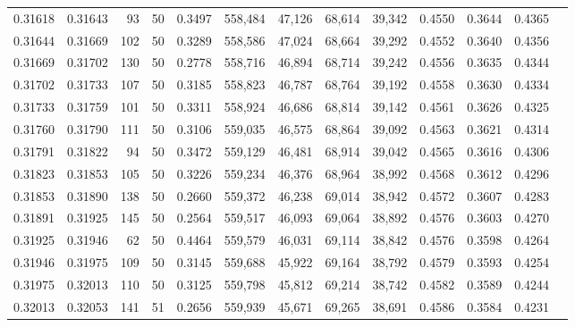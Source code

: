 \begin{tabular}{rrrrrrrrrrrrr}
0.31618 & 0.31643 &    93 &  50 &                                     0.3497 & 558,484 &  47,126 &  68,614 &  39,342 & 0.4550 & 0.3644 & 0.4365 \\
0.31644 & 0.31669 &   102 &  50 &                                     0.3289 & 558,586 &  47,024 &  68,664 &  39,292 & 0.4552 & 0.3640 & 0.4356 \\
0.31669 & 0.31702 &   130 &  50 &                                     0.2778 & 558,716 &  46,894 &  68,714 &  39,242 & 0.4556 & 0.3635 & 0.4344 \\
0.31702 & 0.31733 &   107 &  50 &                                     0.3185 & 558,823 &  46,787 &  68,764 &  39,192 & 0.4558 & 0.3630 & 0.4334 \\
0.31733 & 0.31759 &   101 &  50 &                                     0.3311 & 558,924 &  46,686 &  68,814 &  39,142 & 0.4561 & 0.3626 & 0.4325 \\
0.31760 & 0.31790 &   111 &  50 &                                     0.3106 & 559,035 &  46,575 &  68,864 &  39,092 & 0.4563 & 0.3621 & 0.4314 \\
0.31791 & 0.31822 &    94 &  50 &                                     0.3472 & 559,129 &  46,481 &  68,914 &  39,042 & 0.4565 & 0.3616 & 0.4306 \\
0.31823 & 0.31853 &   105 &  50 &                                     0.3226 & 559,234 &  46,376 &  68,964 &  38,992 & 0.4568 & 0.3612 & 0.4296 \\
0.31853 & 0.31890 &   138 &  50 &                                     0.2660 & 559,372 &  46,238 &  69,014 &  38,942 & 0.4572 & 0.3607 & 0.4283 \\
0.31891 & 0.31925 &   145 &  50 &                                     0.2564 & 559,517 &  46,093 &  69,064 &  38,892 & 0.4576 & 0.3603 & 0.4270 \\
0.31925 & 0.31946 &    62 &  50 &                                     0.4464 & 559,579 &  46,031 &  69,114 &  38,842 & 0.4576 & 0.3598 & 0.4264 \\
0.31946 & 0.31975 &   109 &  50 &                                     0.3145 & 559,688 &  45,922 &  69,164 &  38,792 & 0.4579 & 0.3593 & 0.4254 \\
0.31975 & 0.32013 &   110 &  50 &                                     0.3125 & 559,798 &  45,812 &  69,214 &  38,742 & 0.4582 & 0.3589 & 0.4244 \\
0.32013 & 0.32053 &   141 &  51 &                                     0.2656 & 559,939 &  45,671 &  69,265 &  38,691 & 0.4586 & 0.3584 & 0.4231 \\

\end{tabular}
